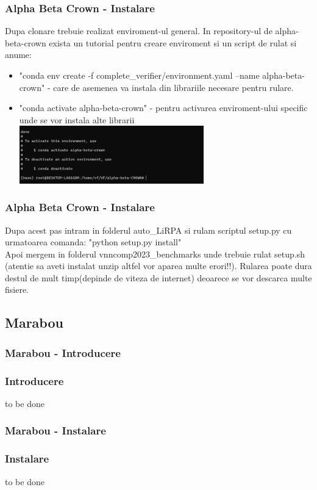 \documentclass{beamer}
\newcommand\tab[1][1cm]{\hspace*{#1}}
\begin{document}
\begin{frame}
\frametitle{Alpha Beta Crown - Instalare}

\tab Dupa clonare trebuie realizat enviroment-ul general. In repository-ul de alpha-beta-crown exista un tutorial pentru creare enviroment si un script de rulat si anume:
\begin{itemize}
  \item "conda env create -f complete\_verifier/environment.yaml --name alpha-beta-crown" - care de asemenea va instala din librariile necesare pentru rulare.
  \item "conda activate alpha-beta-crown" - pentru activarea enviroment-ului specific unde se vor instala alte librarii
  \\
\includegraphics[width=8cm]{2.png}
\end{itemize}
\end{frame}
\begin{frame}
\frametitle{Alpha Beta Crown - Instalare}

\tab Dupa acest pas intram in folderul auto\_LiRPA si rulam scriptul setup.py cu urmatoarea comanda:
"python setup.py install"\\
\tab Apoi mergem in folderul vnncomp2023\_benchmarks unde trebuie rulat setup.sh (atentie sa aveti instalat unzip altfel vor aparea multe erori!!). Rularea poate dura destul de mult timp(depinde de viteza de internet) deoarece se vor descarca multe fisiere.\\
\end{frame}
\begin{frame}

\subsection{Marabou}
\frametitle{Marabou - Introducere}

\subsubsection{Introducere}
to be done
\end{frame}
\begin{frame}

\frametitle{Marabou - Instalare}

\subsubsection{Instalare}
to be done
\end{frame}
\end{document}
